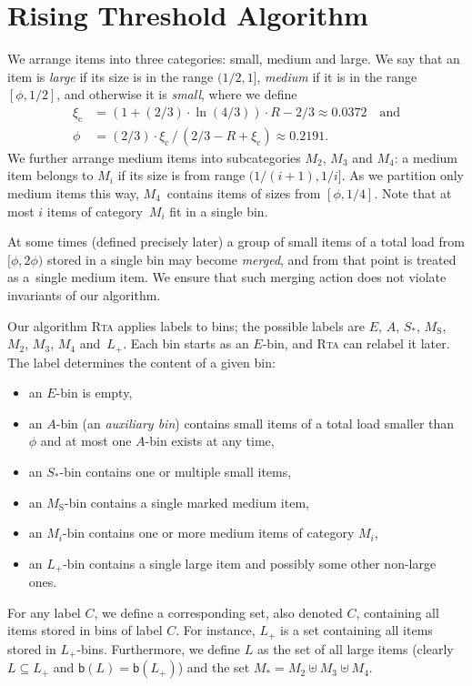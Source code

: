 \documentclass[a4paper,USenglish,cleveref]{lipics-v2019}
\newcommand{\R}{\ensuremath{R}}
\newcommand{\LG}{\ensuremath{L}\xspace}
\newcommand{\M}{\ensuremath{M_\mathrm{S}}\xspace}
\newcommand{\A}{\ensuremath{A}\xspace}
\newcommand{\ST}{\ensuremath{S_*}\xspace}
\newcommand{\MT}{\ensuremath{M_*}\xspace}
\newcommand{\MTI}[1]{\ensuremath{M_{#1}\xspace}}
\newcommand{\LT}{\ensuremath{L_+}\xspace}
\newcommand{\emptyBucket}{\ensuremath{E}\xspace}
\newcommand{\smallBoundary}{\ensuremath{\phi}}
\newcommand{\gconst}{\ensuremath{\xi_\mathrm{c}}}
\newcommand{\B}{\textsf{b}}
\newcommand{\ALG}{\textsc{Rta}\xspace}
\begin{document}

\section{Rising Threshold Algorithm}
\label{sec:algorithm}

We arrange items into three categories: small, medium and large. We say that an
item is \emph{large} if its size is in the range $(1/2,1 ]$, \emph{medium} if it
is in the range $[\smallBoundary, 1/2]$, and otherwise it is \emph{small},
where we define
\begin{align}
  \label{eq:gconst_def}
  \gconst & = (1 + (2/3) \cdot \ln(4/3)) \cdot \R - 2/3 \approx 0.0372 \quad \text{and}  \\
  \label{eq:small_boundary}
  \smallBoundary & = (2/3) \cdot \gconst \,/\, (2/3 - \R + \gconst) \approx 0.2191.
\end{align}
We further arrange medium items into subcategories $\MTI{2}$, $\MTI{3}$ and
$\MTI{4}$: a medium item belongs to $\MTI{i}$ if its size is from range
$(1/(i+1), 1/i]$. As we partition only medium items this way, $\MTI{4}$~contains
items of sizes from $[\smallBoundary, 1/4]$. Note that at most $i$ items of
category~$\MTI{i}$ fit in a single bin. 

At some times (defined precisely later) a group of small items of a total load
from $[\smallBoundary, 2 \smallBoundary)$ stored in a single bin may
become \emph{merged}, and from that point is treated as a~single medium item. We
ensure that such merging action does not violate invariants of our algorithm.

Our algorithm \ALG applies labels to bins; the possible labels are \emptyBucket,
\A, \ST, \M, $\MTI{2}$, $\MTI{3}$, $\MTI{4}$ and~\LT. Each bin starts as an
\emptyBucket-bin, and \ALG can relabel it later. The label determines
the content of a given bin:
%
\begin{itemize}
  \item an $\emptyBucket$-bin is empty,
  \item an \A-bin (an \emph{auxiliary bin}) contains small items of a total load 
      smaller than $\smallBoundary$ and at most one \A-bin exists at any time,
  \item an \ST-bin contains one or multiple small items,
  \item an \M-bin contains a single marked medium item,
  \item an $\MTI{i}$-bin contains one or more medium items of
  category $\MTI{i}$,
  \item an \LT-bin contains a single large item and possibly some other non-large ones.
\end{itemize}
For any label $C$, we define a corresponding set, also denoted $C$, containing all items
stored in bins of label $C$. For instance, \LT is a set containing 
all items stored in \LT-bins.
Furthermore, we define \LG as the set of all large items (clearly $\LG \subseteq \LT$
and $\B(\LG) = \B(\LT)$)
and the set $\MT = \MTI{2} \uplus \MTI{3} \uplus \MTI{4}$.
\end{document}
